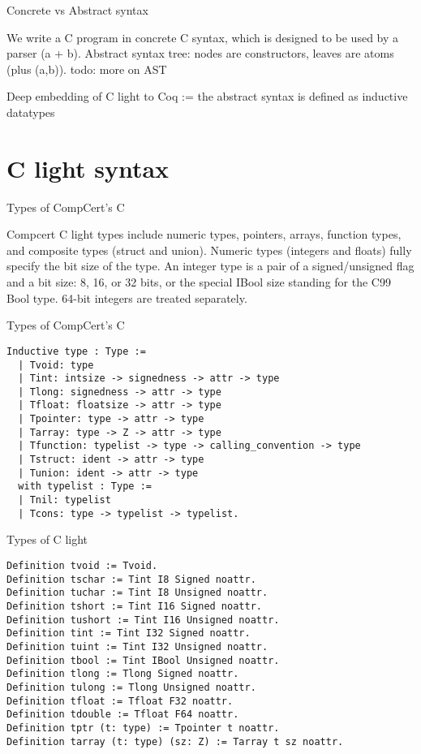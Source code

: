 \documentclass{beamer}
\begin{document}
\begin{frame}
  Concrete vs Abstract syntax

  We write a C program in concrete C syntax, which is designed to be used by a parser (a + b).
  Abstract syntax tree: nodes are constructors, leaves are atoms (plus (a,b)).
  todo: more on AST

  Deep embedding of C light to Coq := the abstract syntax is defined as inductive datatypes
  
\end{frame}

\section{C light syntax}
\begin{frame}{Types of CompCert's C}

  Compcert C light types include numeric types,
  pointers, arrays, function types, and composite types (struct and union).  Numeric types (integers and floats) fully specify the
  bit size of the type.  An integer type is a pair of a signed/unsigned
  flag and a bit size: 8, 16, or 32 bits, or the special IBool size
  standing for the C99 Bool type.  64-bit integers are treated separately.

\end{frame}

\begin{frame}[fragile]{Types of CompCert's C}
  \begin{lstlisting}[language=Coq]
 Inductive type : Type :=
  | Tvoid: type 
  | Tint: intsize -> signedness -> attr -> type 
  | Tlong: signedness -> attr -> type 
  | Tfloat: floatsize -> attr -> type 
  | Tpointer: type -> attr -> type       
  | Tarray: type -> Z -> attr -> type              
  | Tfunction: typelist -> type -> calling_convention -> type   
  | Tstruct: ident -> attr -> type                 
  | Tunion: ident -> attr -> type                 
  with typelist : Type :=
  | Tnil: typelist
  | Tcons: type -> typelist -> typelist.

\end{lstlisting}


\end{frame}

\begin{frame}[fragile]{Types of C light}
  \begin{lstlisting}[language=Coq]
Definition tvoid := Tvoid.
Definition tschar := Tint I8 Signed noattr.
Definition tuchar := Tint I8 Unsigned noattr.
Definition tshort := Tint I16 Signed noattr.
Definition tushort := Tint I16 Unsigned noattr.
Definition tint := Tint I32 Signed noattr.
Definition tuint := Tint I32 Unsigned noattr.
Definition tbool := Tint IBool Unsigned noattr.
Definition tlong := Tlong Signed noattr.
Definition tulong := Tlong Unsigned noattr.
Definition tfloat := Tfloat F32 noattr.
Definition tdouble := Tfloat F64 noattr.
Definition tptr (t: type) := Tpointer t noattr.
Definition tarray (t: type) (sz: Z) := Tarray t sz noattr.
\end{lstlisting}


\end{frame}
\end{document}
